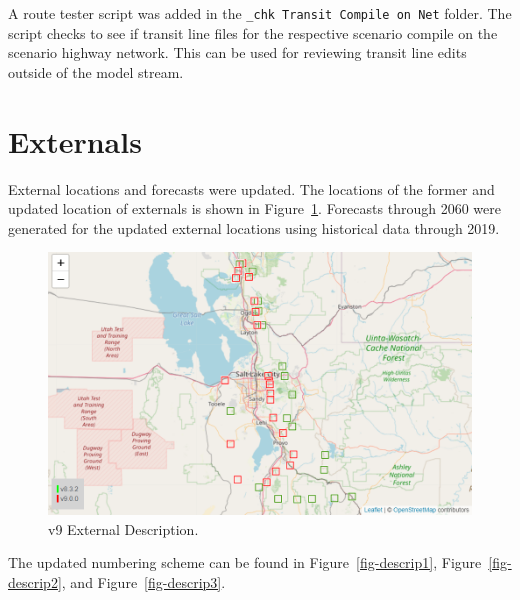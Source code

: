 \documentclass[
  letterpaper,
  DIV=11,
  numbers=noendperiod,
  titlepage=false]{scrreprt}
\begin{document}
A route tester script was added in the
\texttt{\_chk\ Transit\ Compile\ on\ Net} folder. The script checks to
see if transit line files for the respective scenario compile on the
scenario highway network. This can be used for reviewing transit line
edits outside of the model stream.

\hypertarget{externals}{%
\section{Externals}\label{externals}}

External locations and forecasts were updated. The locations of the
former and updated location of externals is shown in
Figure~\ref{fig-externals-pdf}. Forecasts through 2060 were generated
for the updated external locations using historical data through 2019.

\begin{figure}[H]

{\centering \includegraphics{v9x/v900/whats-new/_pictures/externals.png}

}

\caption{\label{fig-externals-pdf}v9 External Description.}

\end{figure}

The updated numbering scheme can be found in Figure~\ref{fig-descrip1},
Figure~\ref{fig-descrip2}, and Figure~\ref{fig-descrip3}.
\end{document}
